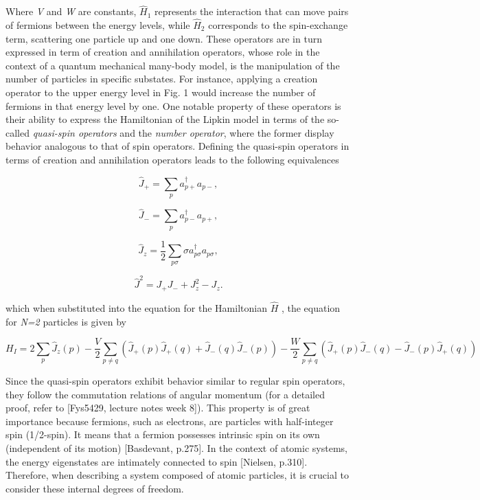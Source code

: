 \documentclass[onecolumn,10pt,cleanfoot]{asme2ej}
\begin{document}
Where \textit{V} and \textit{W} are constants, $\hat{H}_1$ represents the interaction that can move pairs of fermions between the energy levels, while $\hat{H}_2$ corresponds to the spin-exchange term, scattering one particle up and one down. These operators are in turn expressed in term of creation and annihilation operators, whose role in the context of a quantum mechanical many-body model, is the manipulation of the number of particles in specific substates. For instance, applying a creation operator to the upper energy level in Fig. 1 would increase the number of fermions in that energy level by one. One notable property of these operators is their ability to express the Hamiltonian of the Lipkin model in terms of the so-called \textit{quasi-spin operators} and the \textit{number operator}, where the former display behavior analogous to that of spin operators. Defining the quasi-spin operators in terms of creation and annihilation operators leads to the following equivalences 

\begin{equation}
\hat{J}_{+} = \sum_{p} a_{p+}^{\dagger}a_{p-},
\end{equation}

\begin{equation}
\hat{J}_{-} = \sum_{p} a_{p-}^{\dagger}a_{p+},
\end{equation}

\begin{equation}
\hat{J}_{z} = \frac{1}{2}\sum_{p\sigma} \sigma a_{p\sigma}^{\dagger}a_{p\sigma}, 
\end{equation}

\begin{equation}
\hat{J}^{2} = J_{+}J_{-} + J_{z}^{2} - J_{z}.
\end{equation}

which when substituted into the equation for the Hamiltonian $\hat{H}$ , the equation for \textit{N=2} particles is given by

\begin{equation}
	H_I = 2\sum_{p}\hat{J}_z(p) - \frac{V}{2}\sum_{p \neq q}(\hat{J}_+(p)\hat{J}_+(q) + \hat{J}_-(q)\hat{J}_-(p)) - \frac{W}{2}\sum_{p \neq q}(\hat{J}_+(p)\hat{J}_-(q) - \hat{J}_-(p)\hat{J}_+(q))
\end{equation}

Since the quasi-spin operators exhibit behavior similar to regular spin operators, they follow the commutation relations of angular momentum (for a detailed proof, refer to [Fys5429, lecture notes week 8]). This property is of great importance because fermions, such as electrons, are particles with half-integer spin (1/2-spin). It means that a fermion possesses intrinsic spin on its own (independent of its motion) [Basdevant, p.275]. In the context of atomic systems, the energy eigenstates are intimately connected to spin [Nielsen, p.310]. Therefore, when describing a system composed of atomic particles, it is crucial to consider these internal degrees of freedom.
\end{document}
